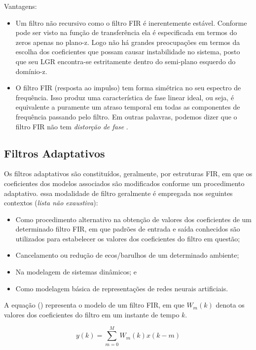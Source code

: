 		Vantagens:
		\begin{itemize}
			\item Um filtro não recursivo como o filtro FIR é inerentemente estável. Conforme pode ser visto na função de transferência ela é especificada em termos do zeros apenas no plano-z. Logo não há grandes preocupações em termos da escolha dos coeficientes que possam causar instabilidade no sistema, posto que seu LGR encontra-se estritamente dentro do semi-plano esquerdo do domínio-z.
			\item O filtro FIR (resposta ao impulso) tem forma simétrica no seu espectro de frequência. Isso produz uma característica de fase linear ideal, ou seja, é equivalente a puramente um atraso temporal em todas as componentes de frequência passando pelo filtro. Em outras palavras, podemos dizer que o filtro FIR não tem \textit{distorção de fase} \cite{Lynn1998}.
		\end{itemize}
	
	\subsection{Filtros Adaptativos}
	
		Os filtros adaptativos são constituídos, geralmente, por estruturas FIR, em que os coeficientes dos modelos associados são modificados conforme um procedimento adaptativo. essa modalidade de filtro geralmente é empregada nos seguintes contextos (\textit{lista não exaustiva}):
		
		\begin{itemize}
			\item Como procedimento alternativo na obtenção de valores dos coeficientes de um determinado filtro FIR, em que padrões de entrada e saída conhecidos são utilizados para estabelecer os valores dos coeficientes do filtro em questão;
			\item Cancelamento ou redução de ecos/barulhos de um determinado ambiente;
			\item Na modelagem de sistemas dinâmicos; e
			\item Como modelagem básica de representações de redes neurais artificiais.
		\end{itemize}
	
		A equação () representa o modelo de um filtro FIR, em que $W_m(k)$ denota os valores dos coeficientes do filtro em um instante de tempo $k$. 
		
		\begin{equation}
			\label{eq1-filtroadap}
			y(k) = \sum_{m=0}^{M} W_m(k)x(k-m)
		\end{equation}
		
